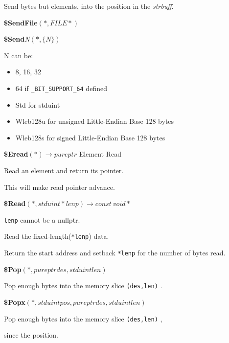 Send bytes but elements, into the position in the \textit{strbuff}.



\textbf{\$SendFile}$(*, FILE*)$



\textbf{\$Send}\textit{N}$(*, \{N\})$



N can be:

\begin{itemize}

\item 8, 16, 32
\item 64 if \verb|_BIT_SUPPORT_64| defined
\item Std for stduint
\item Wleb128u for unsigned Little-Endian Base 128 bytes
\item Wleb128s for   signed Little-Endian Base 128 bytes
\end{itemize}

\textbf{\$Eread}$(*) \rightarrow pureptr$ Element Read



Read an element and return its pointer.

This will make read pointer advance.



\textbf{\$Read}$(*, stduint* lenp) \rightarrow const\ void*$



\verb|lenp| cannot be a nullptr.

Read the fixed-length(\verb|*lenp|) data.

Return the start address and setback \verb|*lenp| for the number of bytes read.



\textbf{\$Pop}$(*, pureptr des, stduint len)$



Pop enough bytes into the memory slice \verb|(des,len)| .



\textbf{\$Popx}$(*, stduint pos, pureptr des, stduint len)$



Pop enough bytes into the memory slice \verb|(des,len)| ,

since the position.



